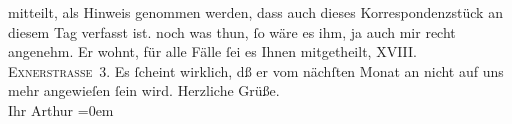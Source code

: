 \begin{ledgroupsized}[t]{13cm}
{{{                  mitteilt, als Hinweis genommen werden, dass auch dieses Korrespondenzstück an
                  diesem Tag verfasst ist.}}}\label{K_L00324_1h} noch was thun, ſo wäre es ihm, ja auch mir recht
               angenehm. Er wohnt, für alle Fälle ſei es Ihnen mitgetheilt, \textsc{XVIII. Exnerstraße 3}. Es ſcheint wirklich, dß er vom nächſten Monat {\pb}an
               nicht auf uns mehr angewieſen ſein wird.\pend
           \pstart
           Herzliche Grüße.{\\[\baselineskip]}Ihr \spacefill\mbox{Arthur}\pend
           \leftskip=0em{}\endnumbering{}\end{ledgroupsized}  \newcommand{\dateiname}{L00324}\newcommand{\titel}{Arthur Schnitzler an Hugo von Hofmannsthal, [15. 5. 1894?]}\newcommand{\editorInnen}{Martin Anton Müller und Gerd-Hermann Susen}
      